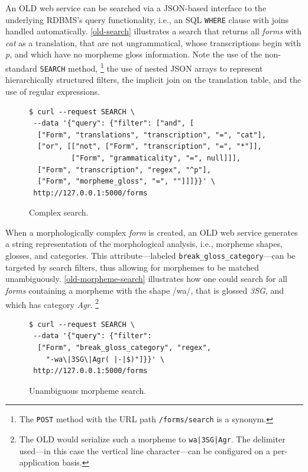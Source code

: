 \documentclass[11pt]{article}
\begin{document}
An OLD web service can be searched via a JSON-based interface to the underlying
RDBMS's query functionality, i.e., an SQL \texttt{WHERE} clause with joins
handled automatically. \autoref{old-search} illustrates a search that returns
all \emph{forms} with \textit{cat} as a translation, that are not ungrammatical, whose
transcriptions begin with \textit{p}, and which have no morpheme gloss
information. Note the use of the non-standard \texttt{SEARCH} method,%
\footnote{The \texttt{POST} method with the URL path \texttt{/forms/search} is
a synonym.} %
the use of nested JSON arrays to represent hierarchically structured filters,
the implicit join on the translation table, and the use of regular expressions.

\begin{figure}[h]
\scriptsize
\begin{verbatim}
$ curl --request SEARCH \
 --data '{"query": {"filter": ["and", [
  ["Form", "translations", "transcription", "=", "cat"],
  ["or", [["not", ["Form", "transcription", "=", "*"]],
          ["Form", "grammaticality", "=", null]]],
  ["Form", "transcription", "regex", "^p"],
  ["Form", "morpheme_gloss", "=", ""]]]}}' \
 http://127.0.0.1:5000/forms
\end{verbatim}
\normalsize
\caption{Complex search.}
\label{old-search}
\end{figure}

When a morphologically complex \emph{form} is created, an OLD web service generates
a string representation of the morphological analysis, i.e., morpheme shapes,
glosses, and categories. This attribute---labeled
\texttt{break\_gloss\_category}---can be targeted by search filters, thus allowing
for morphemes to be matched unambiguously. \autoref{old-morpheme-search}
illustrates how one could search for all \emph{forms} containing a morpheme with the
shape /wa/, that is glossed \textit{3SG}, and which has category \textit{Agr}.%
\footnote{The OLD would serialize such a morpheme to \texttt{wa|3SG|Agr}. The
delimiter used---in this case the vertical line character---can be configured on
a per-application basis.}

\begin{figure}[h]
\scriptsize
\begin{verbatim}
$ curl --request SEARCH \
 --data '{"query": {"filter":
  ["Form", "break_gloss_category", "regex",
    "-wa\|3SG\|Agr( |-|$)"]}}' \
 http://127.0.0.1:5000/forms
\end{verbatim}
\normalsize
\caption{Unambiguous morpheme search.}
\label{old-morpheme-search}
\end{figure}
\end{document}
